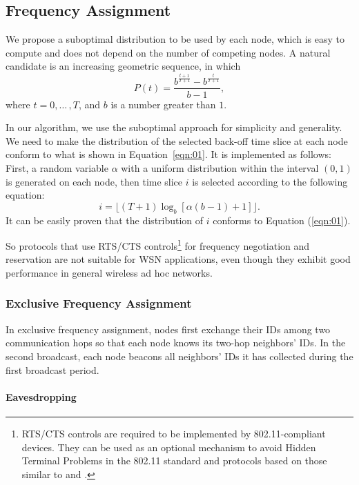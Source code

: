 \subsection{Frequency Assignment}

We propose a suboptimal distribution to be used by each node, which is
easy to compute and does not depend on the number of competing
nodes. A natural candidate is an increasing geometric sequence, in
which
\begin{equation}
\label{eqn:01}
P(t)=\frac{b^{\frac{t+1}{T+1}}-b^{\frac{t}{T+1}}}{b-1},
\end{equation}
where $t=0,{\ldots}\,,T$, and $b$ is a number greater than $1$.

In our algorithm, we use the suboptimal approach for simplicity and
generality. We need to make the distribution of the selected back-off
time slice at each node conform to what is shown in
Equation~\eqref{eqn:01}. It is implemented as follows: First, a random
variable $\alpha$ with a uniform distribution within the interval $(0,
1)$ is generated on each node, then time slice $i$ is selected
according to the following equation:
\[
i=\lfloor(T+1)\log_b[\alpha(b-1)+1]\rfloor.
\]
It can be easily proven that the distribution of $i$ conforms to Equation
(\ref{eqn:01}).

So protocols \cite{Bahl-02, Culler-01,Zhou-06,Adya-01,
Tzamaloukas-01, Akyildiz-01} that use RTS/CTS
controls\footnote{RTS/CTS controls are required to be implemented by
802.11-compliant devices. They can be used as an optional mechanism
to avoid Hidden Terminal Problems in the 802.11 standard and
protocols based on those similar to \cite{Akyildiz-01} and
\cite{Adya-01}.} for frequency negotiation and reservation are not
suitable for WSN applications, even though they exhibit good
performance in general wireless ad hoc
networks.

\subsubsection{Exclusive Frequency Assignment}


In exclusive frequency assignment, nodes first exchange their IDs
among two communication hops so that each node knows its two-hop
neighbors' IDs. In the second broadcast, each node beacons all
neighbors' IDs it has collected during the first broadcast period.

\paragraph{Eavesdropping}

